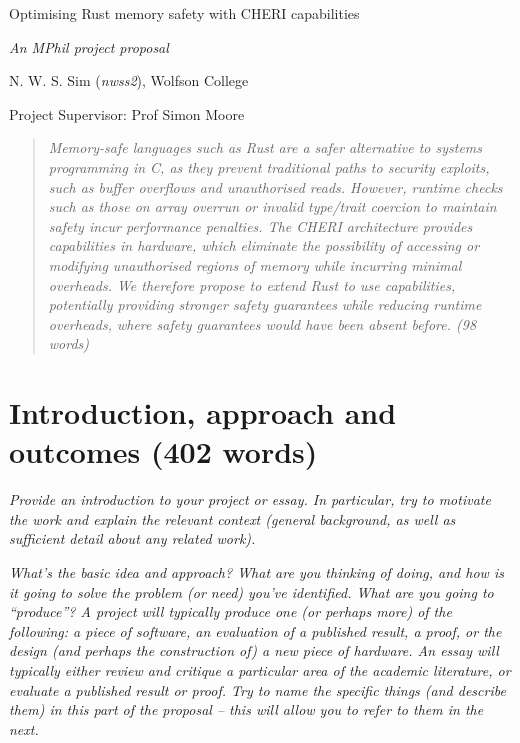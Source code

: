 \documentclass[11pt]{article}
\begin{document}
\centerline{\Large Optimising Rust memory safety with CHERI capabilities}
\vspace{2em}
\centerline{\Large \emph{An MPhil project proposal}}
\vspace{2em}
\centerline{\large N. W. S. Sim (\emph{nwss2}), Wolfson College}
\vspace{1em}
\centerline{\large Project Supervisor: Prof Simon Moore}
\vspace{1em}

\begin{abstract}
\textsl{
Memory-safe languages such as Rust are a safer alternative to systems programming in C, as they prevent traditional paths to security exploits, such as buffer overflows and unauthorised reads.
However, runtime checks such as those on array overrun or invalid type/trait coercion to maintain safety incur performance penalties.
The CHERI architecture provides \emph{capabilities} in hardware, which eliminate the possibility of accessing or modifying unauthorised regions of memory while incurring minimal overheads.
We therefore propose to extend Rust to use capabilities, potentially providing stronger safety guarantees while reducing runtime overheads, where safety guarantees would have been absent before.
(98 words)} 
\end{abstract}

\section{Introduction, approach and outcomes (402 words)}

\textsl{Provide an introduction to your project or essay. In particular, try to
  motivate the work and explain the relevant context (general
  background, as well as sufficient detail about any related
  work).}

\textsl{What's the basic idea and approach? What are you thinking of 
doing, and how is it going to solve the problem (or need) you've 
identified. What are you going to ``produce''? 
A project will typically produce one (or perhaps more) of the following:
a piece of software, an evaluation of a published result, a proof, or
the design (and perhaps the construction of) a new piece of hardware. An
essay will typically either review and critique a particular area of the
academic literature, or evaluate a published result or proof. Try to 
name the specific things (and describe them) in this part of the 
proposal -- this will allow you to refer to them in the next.} 
\end{document}

